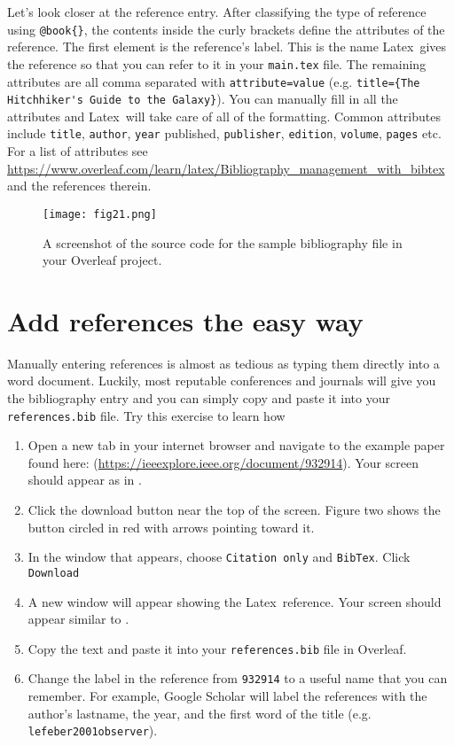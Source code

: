 \documentclass[10pt]{article}
\renewcommand{\LaTeX}{Latex}
\begin{document}
Let’s look closer at the reference entry. After classifying the type of reference using \lstinline!@book{}!, the contents inside the curly brackets define the attributes of the reference. The first element is the reference’s label. This is the name \LaTeX\ gives the reference so that you can refer to it in your \lstinline{main.tex} file. The remaining attributes are all comma separated with \lstinline{attribute=value} (e.g. \lstinline!title={The Hitchhiker's Guide to the Galaxy}!). You can manually fill in all the attributes and \LaTeX\ will take care of all of the formatting. Common attributes include \lstinline{title}, \lstinline{author}, \lstinline{year} published, \lstinline{publisher}, \lstinline{edition}, \lstinline{volume}, \lstinline{pages} etc. For a list of attributes see \url{https://www.overleaf.com/learn/latex/Bibliography_management_with_bibtex} and the references therein.

\begin{figure}
\begin{center}
\texttt{[image: fig21.png]}
\end{center}
\caption{A screenshot of the source code for the sample bibliography file in your Overleaf project.}
\label{fig:1}
\end{figure}

\section{Add references the easy way} 
Manually entering references is almost as tedious as typing them directly into a word document. Luckily, most reputable conferences and journals will give you the bibliography entry and you can simply copy and paste it into your \lstinline{references.bib} file. Try this exercise to learn how 
\begin{enumerate}
\item Open a new tab in your internet browser and navigate to the example paper found here: (\url{https://ieeexplore.ieee.org/document/932914}). Your screen should appear as in .
\item Click the download button near the top of the screen. Figure two shows the button circled in red with arrows pointing toward it.
\item In the window that appears, choose \lstinline{Citation only} and \lstinline{BibTex}. Click \lstinline{Download}
\item A new window will appear showing the \LaTeX\ reference. Your screen should appear similar to . 
\item Copy the text and paste it into your \lstinline{references.bib} file in Overleaf.
\item Change the label in the reference from \lstinline{932914} to a useful name that you can remember. For example, Google Scholar will label the references with the author's lastname, the year, and the first word of the title (e.g. \lstinline{lefeber2001observer}).
\end{enumerate}
\end{document}
